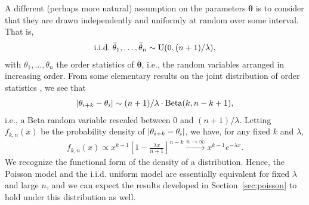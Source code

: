 A different (perhaps more natural) assumption on the parameters $\bm{\theta}$ is to consider that they are drawn independently and uniformly at random over some interval.
That is,
\begin{align*}
\text{i.i.d.}\; \bar{\theta}_1, \ldots, \bar{\theta}_n \sim \mathrm{U}( 0, (n+1) / \lambda ),
\end{align*}
with $\theta_1, \ldots, \theta_n$ the order statistics of $\bar{\bm{\theta}}$, i.e., the random variables arranged in increasing order.
From some elementary results on the joint distribution of order statistics \citep[see, e.g.,][]{arnold2008first}, we see that
\begin{align*}
\lvert \theta_{i+k} - \theta_{i} \rvert \sim (n+1) / \lambda \cdot \mathrm{Beta}( k, n - k + 1 ),
\end{align*}
i.e., a Beta random variable rescaled between $0$ and $(n+1) / \lambda$.
Letting $f_{k,n}(x)$ be the probability density of $\lvert \theta_{i+k} - \theta_{i} \rvert$, we have, for any fixed $k$ and $\lambda$,
\begin{align*}
f_{k,n}(x) \propto x^{k-1} \left[ 1 - \frac{\lambda x}{n + 1} \right]^{n - k} \xrightarrow{n \to \infty} x^{k-1} e^{-\lambda x}.
\end{align*}
We recognize the functional form of the density of a  distribution.
Hence, the Poisson model and the i.i.d. uniform model are essentially equivalent for fixed $\lambda$ and large $n$, and we can expect the results developed in Section~\ref{sec:poisson} to hold under this distribution as well.
